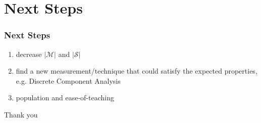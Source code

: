\documentclass[compress,mathserif,xcolor=dvipsnames,svgnames,aspectratio=43]{beamer}
\begin{document}
\section{Next Steps}

\begin{frame}[c]
  \frametitle{Next Steps}
  \begin{enumerate}
    \item decrease $|\mathcal{M}|$ and $|\mathcal{S}|$
    \item find a new measurement/technique that could satisfy the expected properties, e.g. Discrete Component Analysis
    \item population and ease-of-teaching
  \end{enumerate}
  
\end{frame}


\appendix
{}
\setcounter{finalframe}{\value{framenumber}}

\begin{frame} %

\begin{center}
\huge{Thank you}
\end{center}
\end{frame}

\begin{frame}
\tiny{
   
   
}
\end{frame}

\setcounter{framenumber}{\value{finalframe}}
\end{document}
